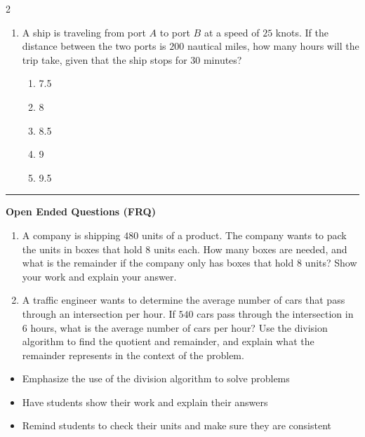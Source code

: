 \documentclass[10pt]{article}
\begin{document}
\begin{multicols}{2}
\begin{enumerate}[label=\textbf{Q\arabic*.}, leftmargin=*, itemsep=6pt, parsep=0pt]
  \item \small A ship is traveling from port $A$ to port $B$ at a speed of $25$ knots. If the distance between the two ports is $200$ nautical miles, how many hours will the trip take, given that the ship stops for $30$ minutes?
  \begin{enumerate}[label=(\Alph*), leftmargin=0.6cm, nosep, itemsep=2pt]
    \item 7.5
    \item 8
    \item 8.5
    \item 9
    \item 9.5
  \end{enumerate}

\end{enumerate}
\end{multicols}

\vspace{-0.2cm}
\hrule
\vspace{0.2cm}
\textbf{\small Open Ended Questions (FRQ)}
\begin{enumerate}[label=\textbf{Q\arabic*.}, start=9, itemsep=5pt, topsep=0pt]

  \item \small A company is shipping $480$ units of a product. The company wants to pack the units in boxes that hold $8$ units each. How many boxes are needed, and what is the remainder if the company only has boxes that hold $8$ units? Show your work and explain your answer. \vspace{2cm}

  \item \small A traffic engineer wants to determine the average number of cars that pass through an intersection per hour. If $540$ cars pass through the intersection in $6$ hours, what is the average number of cars per hour? Use the division algorithm to find the quotient and remainder, and explain what the remainder represents in the context of the problem. \vspace{2cm}

\end{enumerate}

\vfill

\begin{tcolorbox}[colback=blue!5, colframe=mainblue!50, title=\small \textbf{Chef's Tips}, fonttitle=\bfseries, bottom=1mm]
\begin{itemize}[noitemsep, topsep=2pt, leftmargin=0.5cm]
  \item \scriptsize Emphasize the use of the division algorithm to solve problems\item \scriptsize Have students show their work and explain their answers\item \scriptsize Remind students to check their units and make sure they are consistent
\end{itemize}
\end{tcolorbox}
\end{document}
